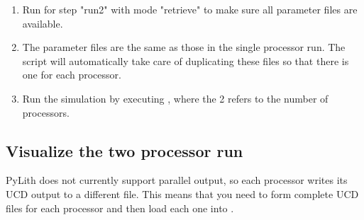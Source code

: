 \begin{enumerate}
\item Run  for step "run2" with mode "retrieve" to
  make sure all parameter files are available.

  \begin{screen}
    \shellprompt{}
  \end{screen}
  
\item The parameter files are the same as those in the single
  processor run. The  script will automatically take
  care of duplicating these files so that there is one for each
  processor.
\item Run the simulation by executing , where
  the 2 refers to the number of processors.

  \begin{screen}
    \shellprompt{}
  \end{screen}
\end{enumerate}

\subsection{Visualize the two processor run}

PyLith does not currently support parallel output, so each processor
writes its UCD output to a different file. This means that you need to
form complete UCD files for each processor and then load each one into
.

